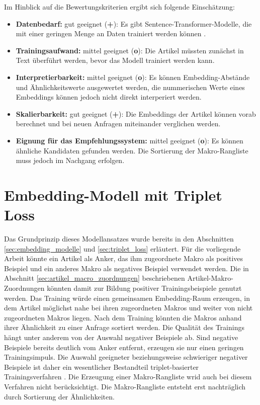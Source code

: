 Im Hinblick auf die Bewertungskriterien ergibt sich folgende Einschätzung: 
\begin{itemize} 
    \item \textbf{Datenbedarf:} gut geeignet (\textbf{+}): Es gibt Sentence-Transformer-Modelle, die mit einer geringen Menge an Daten trainiert werden können \parencite{Reimers2019SentenceBERT,MiniLM2021,Wang2022E5}. 
    \item \textbf{Trainingsaufwand:} mittel geeignet (\textbf{o}): Die Artikel müssten zunächst in Text überführt werden, bevor das Modell trainiert werden kann.
    \item \textbf{Interpretierbarkeit:} mittel geeignet (\textbf{o}): Es können Embedding-Abstände und Ähnlichkeitswerte ausgewertet werden, die nummerischen Werte eines Embeddings können jedoch nicht direkt interperiert werden. 
    \item \textbf{Skalierbarkeit:} gut geeignet (\textbf{+}): Die Embeddings der Artikel können vorab berechnet und bei neuen Anfragen miteinander verglichen werden.
    \item \textbf{Eignung für das Empfehlungssystem:} mittel geeignet (\textbf{o}): Es können ähnliche Kandidaten gefunden werden. Die Sortierung der Makro-Rangliste muss jedoch im Nachgang erfolgen. 
\end{itemize} 

\section{Embedding-Modell mit Triplet Loss} 
\label{sec:eignung_triplet_loss} 

Das Grundprinzip dieses Modellansatzes wurde bereits in den Abschnitten \ref{sec:embedding_modelle} und \ref{sec:triplet_loss} erläutert. 
Für die vorliegende Arbeit könnte ein Artikel als Anker, das ihm zugeordnete Makro als positives Beispiel und ein anderes Makro als negatives Beispiel verwendet werden. 
Die in Abschnitt \ref{sec:artikel_macro_zuordnungen} beschriebenen Artikel-Makro-Zuordnungen könnten damit zur Bildung positiver Trainingsbeispiele genutzt werden. 
Das Training würde einen gemeinsamen Embedding-Raum erzeugen, in dem Artikel möglichst nahe bei ihren zugeordneten Makros und weiter von nicht zugeordneten Makros liegen. 
Nach dem Training könnten die Makros anhand ihrer Ähnlichkeit zu einer Anfrage sortiert werden. 
Die Qualität des Trainings hängt unter anderem von der Auswahl negativer Beispiele ab. Sind negative Beispiele bereits deutlich vom Anker entfernt, erzeugen sie nur einen geringen Trainingsimpuls. 
Die Auswahl geeigneter beziehungsweise schwieriger negativer Beispiele ist daher ein wesentlicher Bestandteil triplet-basierter Trainingsverfahren \parencite{schroff2015facenet}. 
Die Erzeugung einer Makro-Rangliste wrid auch bei diesem Verfahren nicht berücksichtigt. Die Makro-Rangliste entsteht erst nachträglich durch Sortierung der Ähnlichkeiten. 

